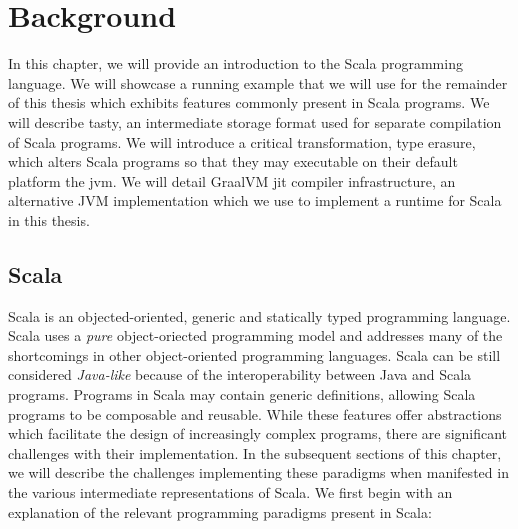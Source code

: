 \chapter{Background}

In this chapter, we will provide an introduction to the Scala programming language. 
We will showcase a running example that we will use for the remainder of this thesis which exhibits features commonly present in Scala programs. 
We will describe \acrfull{tasty}, an intermediate storage format used for separate compilation\cite{???} of Scala programs. 
We will introduce a critical transformation, type erasure, which alters Scala programs so that they may executable on their default platform the \acrfull{jvm}. 
We will detail GraalVM \acrfull{jit} compiler infrastructure, an alternative JVM implementation which we use to implement a runtime for Scala in this thesis.

\section{Scala}

Scala\cite{scala:overview} is an objected-oriented, generic and statically typed programming language.
Scala uses a \textit{pure} object-oriected programming model\cite{smalltalk:design} and addresses many of the shortcomings\cite{go4:design-patterns} in other object-oriented programming languages.
Scala can be still considered \textit{Java-like} because of the interoperability between Java and Scala programs.
Programs in Scala may contain generic definitions, allowing Scala programs to be composable and reusable\cite{scala:origins}.
While these features offer abstractions which facilitate the design of increasingly complex programs, there are significant challenges with their implementation.
In the subsequent sections of this chapter, we will describe the challenges implementing these paradigms when manifested in the various intermediate representations of Scala.
We first begin with an explanation of the relevant programming paradigms present in Scala:

